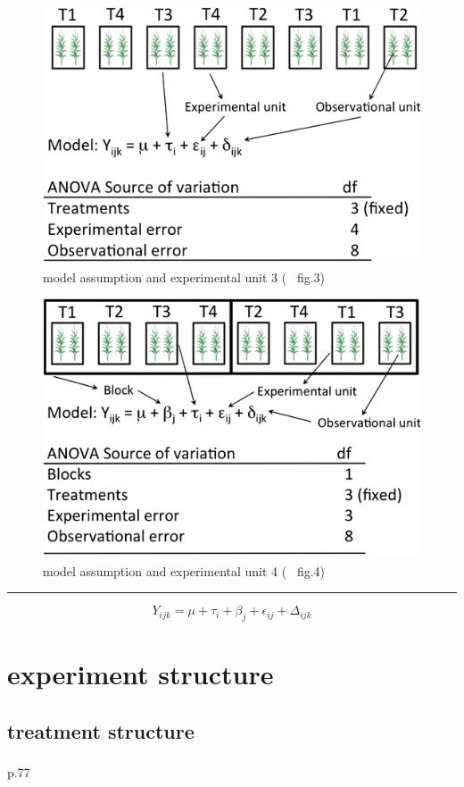 \documentclass[
]{book}
\theoremstyle{definition}
\theoremstyle{definition}
\theoremstyle{definition}
\theoremstyle{definition}
\theoremstyle{remark}
\begin{document}
\begin{figure}
\includegraphics[width=0.5\linewidth]{img/casler2015-fig3} \caption{model assumption and experimental unit 3 (~\textsuperscript{} fig.3)}\label{fig:unnamed-chunk-5}
\end{figure}

\begin{figure}
\includegraphics[width=0.5\linewidth]{img/casler2015-fig4} \caption{model assumption and experimental unit 4 (~\textsuperscript{} fig.4)}\label{fig:unnamed-chunk-6}
\end{figure}

\begin{center}\rule{0.5\linewidth}{0.5pt}\end{center}

\[
Y_{{\scriptscriptstyle ijk}}=\mu+\tau_{{\scriptscriptstyle i}}+\beta_{{\scriptscriptstyle j}}+\epsilon_{{\scriptscriptstyle ij}}+\varDelta_{{\scriptscriptstyle ijk}}
\]

\section{experiment structure}\label{experiment-structure}

\subsection{treatment structure}\label{treatment-structure}

\textsuperscript{} p.77
\end{document}
